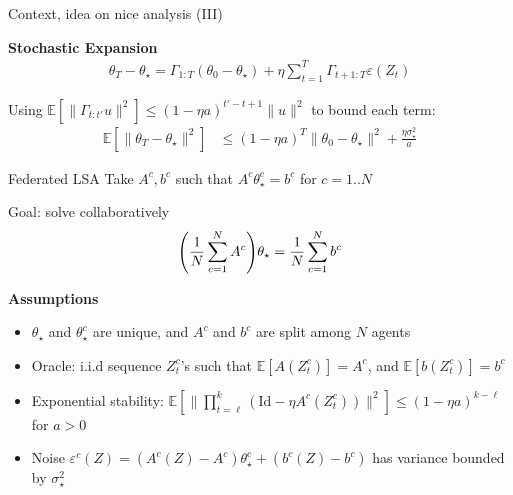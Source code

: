 \documentclass[aspectratio=169,14pt]{beamer}
\begin{document}
\begin{frame}[t]{Context, idea on nice analysis (III) }

  \textbf{Stochastic Expansion}
  \begin{align*}
    \theta_T - \theta_\star
    =
    \Gamma_{1:T} (\theta_0 - \theta_\star) + \eta \sum_{t=1}^T \Gamma_{t+1:T} \varepsilon(Z_t)
  \end{align*}

  \vspace{-0.5em}

  Using $\mathbb{E}[ \| \Gamma_{t:t'} u  \|^2 ] \le (1 - \eta a)^{t' - t + 1} \| u \|^2$ to bound each term:
  \begin{align*}
    \mathbb{E} [ \| \theta_T - \theta_\star \|^2 ]
    & \le
      (1 - \eta a)^T \| \theta_0 - \theta_\star \|^2
      + \frac{\eta \sigma_\star^2}{a}
  \end{align*}

  \vspace{0.5em}
  
\end{frame}


\begin{frame}{Federated LSA}
  Take $A^c, b^c$ such that $A^c \theta_\star^c = b^c$ for $c = 1 .. N$

  \pause
  
  Goal: solve collaboratively
  \begin{equation}
    \small
    \nonumber
    \Bigg( \frac{1}{N} \sum_{c=1}^{N} A^c \Bigg) \theta_\star
    = 
    \frac{1}{N} \sum_{c=1}^{N} b^c
  \end{equation}
  \vspace{-1em}
  
  \textbf{Assumptions}

  \vspace{-0.5em}
  
  \begin{itemize}\setlength{\itemindent}{-1em}
    \small
  \item $\theta_\star$ and $\theta_\star^c$ are unique, and $A^c$ and $b^c$ are split among $N$ agents
    
  \item Oracle: i.i.d sequence $Z_{t}^c$'s such that
    $\mathbb{E} [A(Z_{t}^c)] = A^c$, and
    $\mathbb{E} [b(Z_{t}^c)] = b^c$
    
  \item Exponential stability: $\mathbb{E}[ \| \prod_{t=\ell}^k (\text{Id} - \eta A^c(Z_t^c)) \|^2 ] \le (1 - \eta a)^{k-\ell}$ for $a > 0$

  \item Noise $\varepsilon^c(Z) = (A^c(Z) - A^c) \theta_\star^c + (b^c(Z) - b^c)$ has variance bounded by $\sigma_\star^2$
  \end{itemize}

\end{frame}
\end{document}
